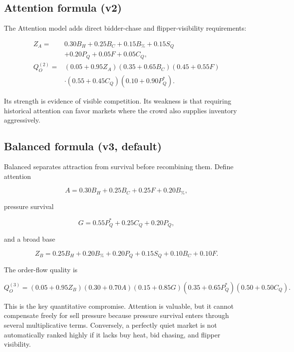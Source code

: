 \documentclass[11pt,a4paper]{article}
\begin{document}
\subsection{Attention formula (v2)}

The Attention model adds direct bidder-chase and flipper-visibility requirements:

\begin{align}
Z_A={}&0.30B_H+0.25B_C+0.15B_\%+0.15S_Q\\
&+0.20P_Q+0.05F+0.05C_Q,\\
Q_O^{(2)}={}&(0.05+0.95Z_A)(0.35+0.65B_C)(0.45+0.55F)\\
&\cdot(0.55+0.45C_Q)(0.10+0.90P_Q^*).
\end{align}

Its strength is evidence of visible competition. Its weakness is that requiring historical
attention can favor markets where the crowd also supplies inventory aggressively.

\subsection{Balanced formula (v3, default)}

Balanced separates attraction from survival before recombining them. Define attention

\begin{equation}
A=0.30B_H+0.25B_C+0.25F+0.20B_\%,
\end{equation}

pressure survival

\begin{equation}
G=0.55P_Q^*+0.25C_Q+0.20P_Q,
\end{equation}

and a broad base

\begin{equation}
Z_B=0.25B_H+0.20B_\%+0.20P_Q+0.15S_Q+0.10B_C+0.10F.
\end{equation}

The order-flow quality is

\begin{equation}
\boxed{
Q_O^{(3)}=(0.05+0.95Z_B)(0.30+0.70A)(0.15+0.85G)
(0.35+0.65P_Q^*)(0.50+0.50C_Q).}
\end{equation}

This is the key quantitative compromise. Attention is valuable, but it cannot compensate
freely for sell pressure because pressure survival enters through several multiplicative
terms. Conversely, a perfectly quiet market is not automatically ranked highly if it lacks
buy heat, bid chasing, and flipper visibility.
\end{document}
